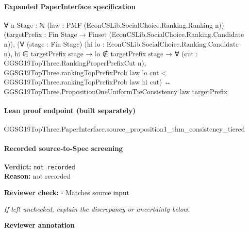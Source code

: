 \documentclass[10pt]{article}
\newcommand{\reviewerbox}{%
  \par\noindent\fbox{\parbox{0.96\linewidth}{\rule{0pt}{0.38in}}}\par
}
\newcommand{\reviewmatch}[1]{%
  \par\noindent\textbf{Reviewer check:} $\square$\; #1\par
  \noindent\emph{If left unchecked, explain the discrepancy or uncertainty below.}\par
}
\begin{document}


\paragraph{Expanded PaperInterface specification}
\begin{ReviewVerbatim}
∀ {n Stage : ℕ} (law : PMF (EconCSLib.SocialChoice.Ranking.Ranking n))
  (targetPrefix : Fin Stage → Finset (EconCSLib.SocialChoice.Ranking.Candidate n)),
  (∀ (stage : Fin Stage) (hi lo : EconCSLib.SocialChoice.Ranking.Candidate n),
      hi ∈ targetPrefix stage →
        lo ∉ targetPrefix stage →
          ∀ (cut : GGSG19TopThree.RankingProperPrefixCut n),
            GGSG19TopThree.rankingTopPrefixProb law lo cut < GGSG19TopThree.rankingTopPrefixProb law hi cut) ↔
    GGSG19TopThree.PropositionOneUniformTieConsistency law targetPrefix
\end{ReviewVerbatim}

\paragraph{Lean proof endpoint (built separately)}\begin{ReviewVerbatim}
GGSG19TopThree.PaperInterface.source_proposition1_thm_consistency_tiered
\end{ReviewVerbatim}

\paragraph{Recorded source-to-Spec screening}
\textbf{Verdict:} \texttt{not recorded}
\\
\textbf{Reason:} not recorded
\reviewmatch{Matches source input}
\noindent\textbf{Reviewer annotation}\par
\reviewerbox
\clearpage
\hypertarget{source-claim-c74374c73696b398}{}
\end{document}
